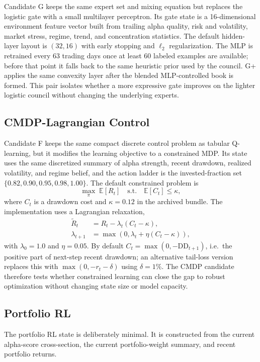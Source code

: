 \documentclass[10pt,twocolumn]{article}
\begin{document}
Candidate G keeps the same expert set and mixing equation but replaces the
logistic gate with a small multilayer perceptron. Its gate state is a
16-dimensional environment feature vector built from trailing alpha quality,
risk and volatility, market stress, regime, trend, and concentration
statistics. The default hidden-layer layout is $(32,16)$ with early stopping
and $\ell_2$ regularization. The MLP is retrained every 63 trading days once
at least 60 labeled examples are available; before that point it falls back to
the same heuristic prior used by the council. G+ applies the same convexity
layer after the blended MLP-controlled book is formed. This pair isolates
whether a more expressive gate improves on the lighter logistic council
without changing the underlying experts.

\subsection{CMDP-Lagrangian Control}

Candidate F keeps the same compact discrete control problem as tabular
Q-learning, but it modifies the learning objective to a constrained MDP. Its
state uses the same discretized summary of alpha strength, recent drawdown,
realized volatility, and regime belief, and the action ladder is the
invested-fraction set $\{0.82, 0.90, 0.95, 0.98, 1.00\}$. The default
constrained problem is
\[
\max_{\pi}\; \mathbb{E}[R_t]
\quad \text{s.t.} \quad
\mathbb{E}[C_t] \le \kappa,
\]
where $C_t$ is a drawdown cost and $\kappa=0.12$ in the archived bundle. The
implementation uses a Lagrangian relaxation,
\begin{align*}
\tilde R_t &= R_t - \lambda_t(C_t-\kappa), \\
\lambda_{t+1} &= \max(0,\lambda_t + \eta(C_t-\kappa)),
\end{align*}
with $\lambda_0=1.0$ and $\eta=0.05$. By default
$C_t = \max(0,-\mathrm{DD}_{t+1})$, i.e.\ the positive part of next-step recent
drawdown; an alternative tail-loss version replaces this with
$\max(0,-r_t-\delta)$ using $\delta=1\%$. The CMDP candidate therefore tests
whether constrained learning can close the gap to robust optimization without
changing state size or model capacity.

\subsection{Portfolio RL}

The portfolio RL state is deliberately minimal. It is constructed from the
current alpha-score cross-section, the current portfolio-weight summary, and
recent portfolio returns.
\end{document}
